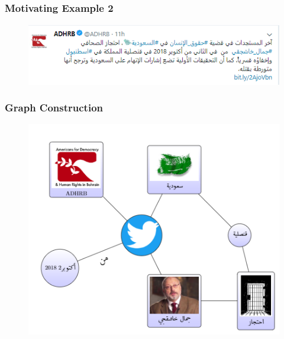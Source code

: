\documentclass[xcolor=table]{beamer}
\begin{document}
\begin{frame}
\frametitle{Motivating Example 2}
\begin{figure}[!htb]
   \centering
    \includegraphics[scale=0.55]{img0009.png}
    
\end{figure}

\end{frame}
\begin{frame}
\frametitle{Graph Construction}
\begin{figure}[!htb]
   \centering
    \includegraphics[scale=0.8]{img0011.png}
    
\end{figure}

\end{frame}
\end{document}
